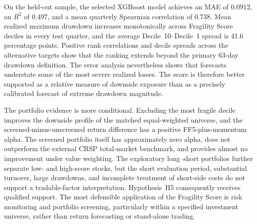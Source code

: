On the held-out sample, the selected XGBoost model achieves an MAE of 0.0912, an $R^2$ of 0.497, and a mean quarterly Spearman correlation of 0.738. Mean realized maximum drawdown increases monotonically across Fragility Score deciles in every test quarter, and the average Decile~10--Decile~1 spread is 41.6 percentage points. Positive rank correlations and decile spreads across the alternative targets show that the ranking extends beyond the primary 63-day drawdown definition. The error analysis nevertheless shows that forecasts understate some of the most severe realized losses. The score is therefore better supported as a relative measure of downside exposure than as a precisely calibrated forecast of extreme drawdown magnitude.

The portfolio evidence is more conditional. Excluding the most fragile decile improves the downside profile of the matched equal-weighted universe, and the screened-minus-unscreened return difference has a positive FF5-plus-momentum alpha. The screened portfolio itself has approximately zero alpha, does not outperform the external CRSP total-market benchmark, and provides almost no improvement under value weighting. The exploratory long--short portfolios further separate low- and high-score stocks, but the short evaluation period, substantial turnover, large drawdowns, and incomplete treatment of short-side costs do not support a tradable-factor interpretation. Hypothesis~H5 consequently receives qualified support. The most defensible application of the Fragility Score is risk monitoring and portfolio screening, particularly within a specified investment universe, rather than return forecasting or stand-alone trading.
